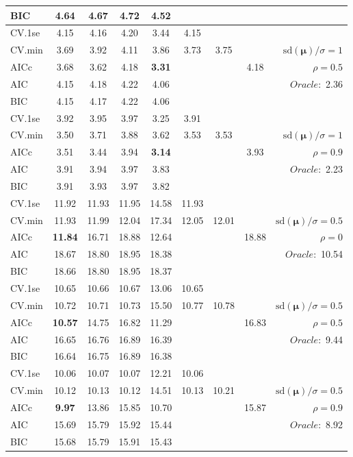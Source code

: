 \begin{table}
\begin{center}
\begin{tabular}{l*{7}{c}|r}
BIC & 4.64 & 4.67 & 4.72 & 4.52 & & & &  \\
 \hline 
CV.1se & 4.15 & 4.16 & 4.20 & 3.44 & 4.15 & & & \\
CV.min & 3.69 & 3.92 & 4.11 & 3.86 & 3.73 & 3.75 & & $\mathrm{sd}(\mathbf{\mu})/\sigma=1$ \\
AICc & 3.68 & 3.62 & 4.18 & {\bf 3.31} & & & 4.18 &  $\rho=0.5$ \\
AIC & 4.15 & 4.18 & 4.22 & 4.06 & & & &  \multirow{2}{*}{$Oracle: $ 2.36} \\
BIC & 4.15 & 4.17 & 4.22 & 4.06 & & & &  \\
 \hline 
CV.1se & 3.92 & 3.95 & 3.97 & 3.25 & 3.91 & & & \\
CV.min & 3.50 & 3.71 & 3.88 & 3.62 & 3.53 & 3.53 & & $\mathrm{sd}(\mathbf{\mu})/\sigma=1$ \\
AICc & 3.51 & 3.44 & 3.94 & {\bf 3.14} & & & 3.93 &  $\rho=0.9$ \\
AIC & 3.91 & 3.94 & 3.97 & 3.83 & & & &  \multirow{2}{*}{$Oracle: $ 2.23} \\
BIC & 3.91 & 3.93 & 3.97 & 3.82 & & & &  \\
 \hline 
CV.1se & 11.92 & 11.93 & 11.95 & 14.58 & 11.93 & & & \\
CV.min & 11.93 & 11.99 & 12.04 & 17.34 & 12.05 & 12.01 & & $\mathrm{sd}(\mathbf{\mu})/\sigma=0.5$ \\
AICc & {\bf 11.84} & 16.71 & 18.88 & 12.64 & & & 18.88 &  $\rho=0$ \\
AIC & 18.67 & 18.80 & 18.95 & 18.38 & & & &  \multirow{2}{*}{$Oracle: $ 10.54} \\
BIC & 18.66 & 18.80 & 18.95 & 18.37 & & & &  \\
 \hline 
CV.1se & 10.65 & 10.66 & 10.67 & 13.06 & 10.65 & & & \\
CV.min & 10.72 & 10.71 & 10.73 & 15.50 & 10.77 & 10.78 & & $\mathrm{sd}(\mathbf{\mu})/\sigma=0.5$ \\
AICc & {\bf 10.57} & 14.75 & 16.82 & 11.29 & & & 16.83 &  $\rho=0.5$ \\
AIC & 16.65 & 16.76 & 16.89 & 16.39 & & & &  \multirow{2}{*}{$Oracle: $ 9.44} \\
BIC & 16.64 & 16.75 & 16.89 & 16.38 & & & &  \\
 \hline 
CV.1se & 10.06 & 10.07 & 10.07 & 12.21 & 10.06 & & & \\
CV.min & 10.12 & 10.13 & 10.12 & 14.51 & 10.13 & 10.21 & & $\mathrm{sd}(\mathbf{\mu})/\sigma=0.5$ \\
AICc & {\bf 9.97} & 13.86 & 15.85 & 10.70 & & & 15.87 &  $\rho=0.9$ \\
AIC & 15.69 & 15.79 & 15.92 & 15.44 & & & &  \multirow{2}{*}{$Oracle: $ 8.92} \\
BIC & 15.68 & 15.79 & 15.91 & 15.43 & & & &  \\
 \hline 
\end{tabular}
\end{center}
\vspace{-1cm}
\end{table}





